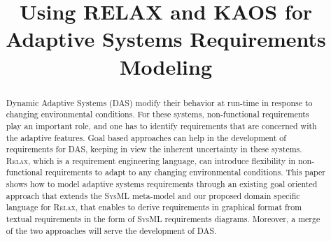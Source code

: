 \documentclass[10pt, conference, compsocconf]{IEEEtran}
\def\myrelax{\textsc{Relax}}                  %
\def\sysml{\textsc{SysML}}
\begin{document}
%
\title{Using RELAX and KAOS for Adaptive Systems Requirements Modeling}



\author{
}


\maketitle

\begin{abstract}
Dynamic Adaptive Systems (DAS) modify their behavior at run-time in response to 
changing environmental conditions. For these systems, non-functional requirements play an 
important role, and one has to identify requirements that are concerned with the adaptive 
features.  Goal based approaches can help in the development of requirements for DAS, keeping in view the inherent uncertainty in these systems. \myrelax{}, which is a requirement engineering language, can introduce flexibility in 
non-functional requirements to adapt to any changing environmental conditions. 
This paper shows how to model adaptive systems requirements through an existing goal 
oriented approach that extends the \sysml{} meta-model and our proposed domain 
specific language for \myrelax{}, that enables to derive requirements in graphical 
format from textual requirements in the form of \sysml{} requirements diagrams. 
Moreover, a merge of the two approaches will serve the development of DAS.
\end{abstract}
\end{document}
